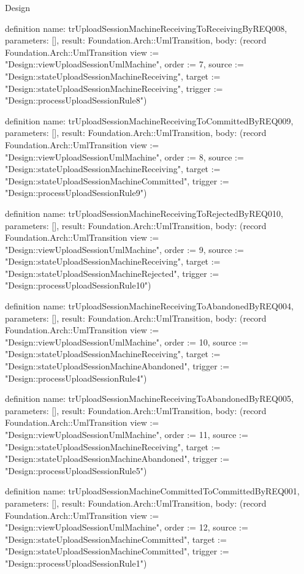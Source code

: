 \begin{lexlean}{Design}
\begin{semanticmodule}
definition{
  name: trUploadSessionMachineReceivingToReceivingByREQ008,
  parameters: [],
  result: Foundation.Arch::UmlTransition,
  body: (record Foundation.Arch::UmlTransition {view := "Design::viewUploadSessionUmlMachine", order := 7, source := "Design::stateUploadSessionMachineReceiving", target := "Design::stateUploadSessionMachineReceiving", trigger := "Design::processUploadSessionRule8"})
}

definition{
  name: trUploadSessionMachineReceivingToCommittedByREQ009,
  parameters: [],
  result: Foundation.Arch::UmlTransition,
  body: (record Foundation.Arch::UmlTransition {view := "Design::viewUploadSessionUmlMachine", order := 8, source := "Design::stateUploadSessionMachineReceiving", target := "Design::stateUploadSessionMachineCommitted", trigger := "Design::processUploadSessionRule9"})
}

definition{
  name: trUploadSessionMachineReceivingToRejectedByREQ010,
  parameters: [],
  result: Foundation.Arch::UmlTransition,
  body: (record Foundation.Arch::UmlTransition {view := "Design::viewUploadSessionUmlMachine", order := 9, source := "Design::stateUploadSessionMachineReceiving", target := "Design::stateUploadSessionMachineRejected", trigger := "Design::processUploadSessionRule10"})
}

definition{
  name: trUploadSessionMachineReceivingToAbandonedByREQ004,
  parameters: [],
  result: Foundation.Arch::UmlTransition,
  body: (record Foundation.Arch::UmlTransition {view := "Design::viewUploadSessionUmlMachine", order := 10, source := "Design::stateUploadSessionMachineReceiving", target := "Design::stateUploadSessionMachineAbandoned", trigger := "Design::processUploadSessionRule4"})
}

definition{
  name: trUploadSessionMachineReceivingToAbandonedByREQ005,
  parameters: [],
  result: Foundation.Arch::UmlTransition,
  body: (record Foundation.Arch::UmlTransition {view := "Design::viewUploadSessionUmlMachine", order := 11, source := "Design::stateUploadSessionMachineReceiving", target := "Design::stateUploadSessionMachineAbandoned", trigger := "Design::processUploadSessionRule5"})
}

definition{
  name: trUploadSessionMachineCommittedToCommittedByREQ001,
  parameters: [],
  result: Foundation.Arch::UmlTransition,
  body: (record Foundation.Arch::UmlTransition {view := "Design::viewUploadSessionUmlMachine", order := 12, source := "Design::stateUploadSessionMachineCommitted", target := "Design::stateUploadSessionMachineCommitted", trigger := "Design::processUploadSessionRule1"})
}


\end{semanticmodule}
\end{lexlean}

